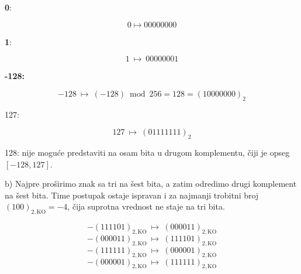 \documentclass[a4paper,11pt]{article}
\numberwithin{equation}{section}
\begin{document}
\textbf{0}:



\begin{equation}\label{eq:2.7.4}
0 \longmapsto 00000000
\end{equation}


\textbf{1}:



\begin{equation}\label{eq:2.7.5}
1\ \longmapsto\ 00000001
\end{equation}


\textbf{-128:}



\begin{equation}\label{eq:2.7.6}
-128\ \longmapsto\ (-128)\bmod256=128=(10000000)_2
\end{equation}


127:

\begin{equation}\label{eq:2.7.8}
127\ \longmapsto\ (01111111)_2
\end{equation}


128: nije moguće predstaviti na osam bita u drugom komplementu, čiji je opseg $[-128,127]$.

b) Najpre proširimo znak sa tri na šest bita, a zatim odredimo drugi komplement na šest bita. Time postupak ostaje ispravan i za najmanji trobitni broj $(100)_{2,\mathrm{KO}}=-4$, čija suprotna vrednost ne staje na tri bita.

\begin{equation}\label{eq:2.7.9}
-(111101)_{2,\mathrm{KO}}\ \longmapsto\ (000011)_{2,\mathrm{KO}}
\end{equation}
\begin{equation}\label{eq:2.7.10}
-(000011)_{2,\mathrm{KO}}\ \longmapsto\ (111101)_{2,\mathrm{KO}}
\end{equation}
\begin{equation}\label{eq:2.7.11}
-(111111)_{2,\mathrm{KO}}\ \longmapsto\ (000001)_{2,\mathrm{KO}}
\end{equation}
\begin{equation}\label{eq:2.7.12}
-(000001)_{2,\mathrm{KO}}\ \longmapsto\ (111111)_{2,\mathrm{KO}}
\end{equation}
\end{document}
